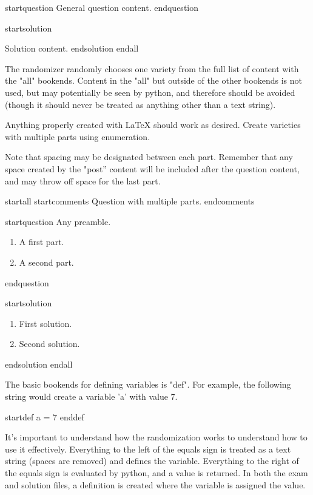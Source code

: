startquestion General question content.
endquestion

startsolution
\item Solution content.
endsolution
endall




The randomizer randomly chooses one variety from the full list of content with the "all" bookends. Content in the "all" but outside of the other bookends is not used, but may potentially be seen by python, and therefore should be avoided (though it should never be treated as anything other than a text string).

Anything properly created with LaTeX should work as desired. Create varieties with multiple parts using enumeration.

Note that spacing may be designated between each part. Remember that any space created by the "post'' content will be included after the question content, and may throw off space for the last part.

startall
startcomments 
Question with multiple parts.
endcomments

startquestion Any preamble. \begin{enumerate}
\item A first part. \vspace{2cm}
\item A second part.
\end{enumerate}
endquestion

startsolution
\item \begin{enumerate}
\item First solution.
\item Second solution.
\end{enumerate}
endsolution
endall





The basic bookends for defining variables is "def". For example, the following string would create a variable 'a' with value 7.

startdef a = 7 enddef

It's important to understand how the randomization works to understand how to use it effectively. Everything to the left of the equals sign is treated as a text string (spaces are removed) and defines the variable. Everything to the right of the equals sign is evaluated by python, and a value is returned. In both the exam and solution files, a definition is created where the variable is assigned the value.

